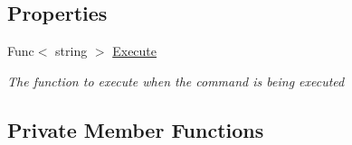 \subsection*{Properties}
\begin{DoxyCompactItemize}
\item 
Func$<$ string $>$ \hyperlink{class_c_p_u___o_s___simulator_1_1_console_1_1_console_command_a9b4fd5675ec062a721c2e5e78022117b}{Execute}
\begin{DoxyCompactList}\small\item\em The function to execute when the command is being executed \end{DoxyCompactList}\end{DoxyCompactItemize}
\subsection*{Private Member Functions}
